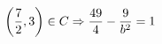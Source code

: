 \documentclass[preview]{standalone}
\begin{document}
\begin{align*}
\special{dvisvgm:raw <g id='unique000'>}\left(\frac{7}{2},3\right) \in C \Rightarrow \frac{49}{4} - \frac{9}{b^2}=1\special{dvisvgm:raw </g>}
\end{align*}
\end{document}
